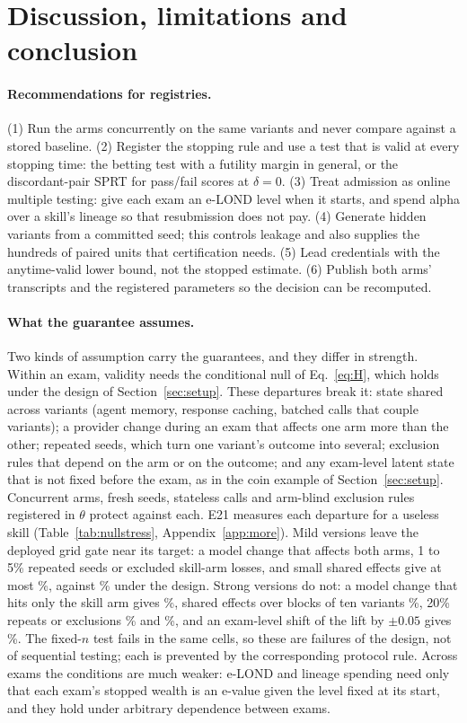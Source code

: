 \section{Discussion, limitations and conclusion}
\label{sec:discussion}

\paragraph{Recommendations for registries.} (1) Run the arms concurrently on the same variants and never compare against a stored baseline. (2) Register the stopping rule and use a test that is valid at every stopping time: the betting test with a futility margin in general, or the discordant-pair SPRT for pass/fail scores at $\delta=0$. (3) Treat admission as online multiple testing: give each exam an e-LOND level when it starts, and spend alpha over a skill's lineage so that resubmission does not pay. (4) Generate hidden variants from a committed seed; this controls leakage and also supplies the hundreds of paired units that certification needs. (5) Lead credentials with the anytime-valid lower bound, not the stopped estimate. (6) Publish both arms' transcripts and the registered parameters so the decision can be recomputed.

\paragraph{What the guarantee assumes.} Two kinds of assumption carry the guarantees, and they differ in strength. Within an exam, validity needs the conditional null of Eq.~\eqref{eq:H}, which holds under the design of Section~\ref{sec:setup}. These departures break it: state shared across variants (agent memory, response caching, batched calls that couple variants); a provider change during an exam that affects one arm more than the other; repeated seeds, which turn one variant's outcome into several; exclusion rules that depend on the arm or on the outcome; and any exam-level latent state that is not fixed before the exam, as in the coin example of Section~\ref{sec:setup}. Concurrent arms, fresh seeds, stateless calls and arm-blind exclusion rules registered in $\theta$ protect against each. E21 measures each departure for a useless skill (Table~\ref{tab:nullstress}, Appendix~\ref{app:more}). Mild versions leave the deployed grid gate near its target: a model change that affects both arms, 1 to 5\% repeated seeds or excluded skill-arm losses, and small shared effects give at most \NNsMildMax\%, against \NNsControl\% under the design. Strong versions do not: a model change that hits only the skill arm gives \NNsSkillArm\%, shared effects over blocks of ten variants \NNsBlock\%, 20\% repeats or exclusions \NNsRepeat\% and \NNsExclude\%, and an exam-level shift of the lift by $\pm0.05$ gives \NNsCoin\%. The fixed-$n$ test fails in the same cells, so these are failures of the design, not of sequential testing; each is prevented by the corresponding protocol rule. Across exams the conditions are much weaker: e-LOND and lineage spending need only that each exam's stopped wealth is an e-value given the level fixed at its start, and they hold under arbitrary dependence between exams.

